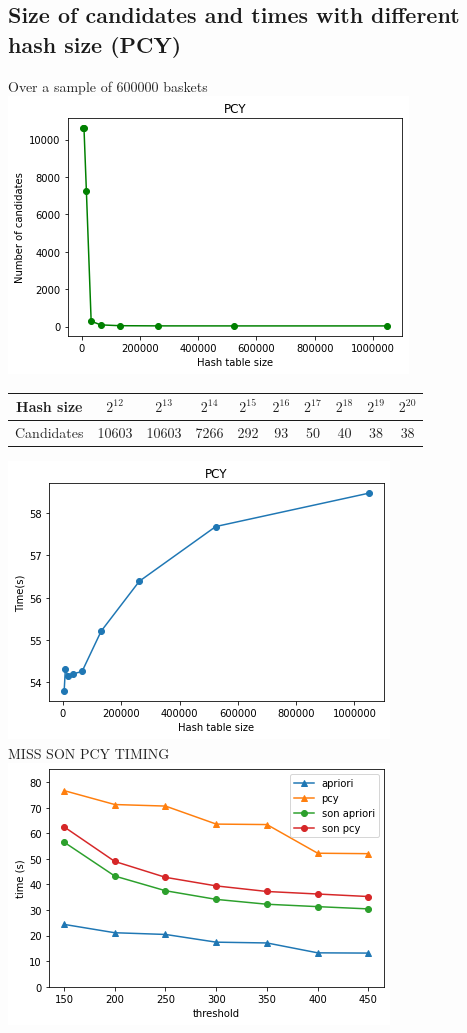 \documentclass[14pt]{extarticle}
\begin{document}
\subsection{Size of candidates and times with different hash size (PCY)}
Over a sample of 600000 baskets\\
\includegraphics[scale=1]{size_by_hsize.png}\\
\begin{center}
\begin{tabular}{ |c||c|c|c|c|c|c|c|c|c| } 
 \hline
 Hash size & $2^{12}$ & $2^{13}$ & $2^{14}$ & $2^{15}$ & $2^{16}$ & $2^{17}$ & $2^{18}$ & $2^{19}$ & $2^{20}$ \\
 \hline
 Candidates & 10603 & 10603 & 7266 & 292 & 93 & 50 & 40 & 38 & 38\\
 \hline
\end{tabular}
\end{center}
\includegraphics[scale=1]{pcy_hsize_time.png}\\
MISS SON PCY TIMING\\

\includegraphics[scale=1]{times.png}\\
\end{document}
